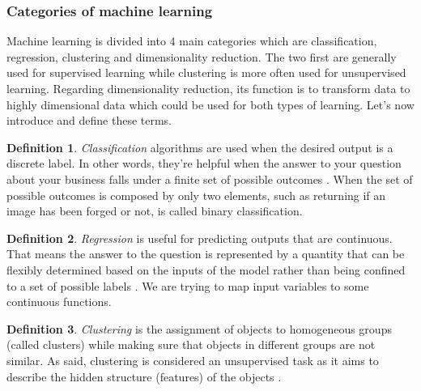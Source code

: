 \documentclass[11pt, openany]{report}
\theoremstyle{plain}
\theoremstyle{definition}
\newtheorem{defn}{Definition}[section]
\theoremstyle{remark}
\begin{document}
\newpage
\subsubsection{Categories of machine learning} \label{sec:categories-ML}
Machine learning is divided into 4 main categories which are classification, regression, clustering and dimensionality reduction. The two first are generally used for supervised learning while clustering is more often used for unsupervised learning. Regarding dimensionality reduction, its function is to transform data to highly dimensional data which could be used for both types of learning. Let's now introduce and define these terms. 

\begin{defn}
\textit{Classification} algorithms are used when the desired output is a discrete label. In other words, they're helpful when the answer to your question about your business falls under a finite set of possible outcomes \cite{class-regression-1}. 
When the set of possible outcomes is composed by only two elements, such as returning if an image has been forged or not, is called binary classification. 
\end{defn}

\begin{defn}
\textit{Regression} is useful for predicting outputs that are continuous. That means the answer to the question is represented by a quantity that can be flexibly determined based on the inputs of the model rather than being confined to a set of possible labels \cite{class-regression-1}. We are trying to map input variables to some continuous functions. 
\end{defn}

\begin{defn}
\textit{Clustering} is the assignment of objects to homogeneous groups (called clusters) while making sure that objects in different groups are not similar. As said, clustering is considered an unsupervised task as it aims to describe the hidden structure (features) of the objects \cite{clustering-dimensionalityReduction-1}  . 
\end{defn}
\end{document}
